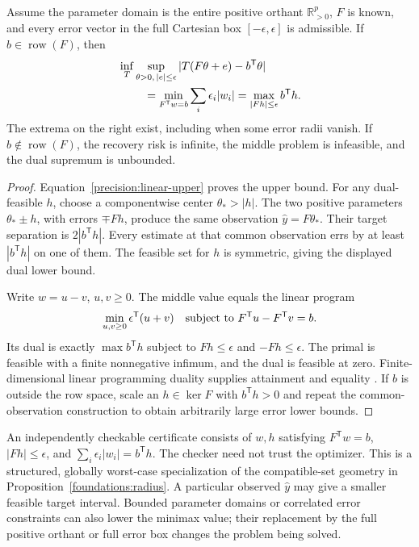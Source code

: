 \begin{theorem}
\label{precision:linear-minimax}
Assume the parameter domain is the entire positive orthant
$\mathbb R^p_{>0}$, $F$ is known, and every error vector in the full Cartesian
box $[-\epsilon,\epsilon]$ is admissible. If $b\in\operatorname{row}(F)$, then
\begin{align}
 &\inf_T\sup_{\theta>0,\,|e|\leq\epsilon}
       |T(F\theta+e)-b^{\mathsf T}\theta| \nonumber\\
 &\hspace{8mm}=\min_{F^{\mathsf T}w=b}\sum_i\epsilon_i|w_i|
   =\max_{|Fh|\leq\epsilon}b^{\mathsf T}h.
 \label{precision:linear-duality}
\end{align}
The extrema on the right exist, including when some error radii vanish.
If $b\notin\operatorname{row}(F)$, the recovery risk is infinite, the middle
problem is infeasible, and the dual supremum is unbounded.
\end{theorem}
\begin{proof}
Equation~\eqref{precision:linear-upper} proves the upper bound. For any dual-feasible
$h$, choose a componentwise center $\theta_*>|h|$. The two positive parameters
$\theta_*\pm h$, with errors $\mp Fh$, produce the same observation
$\widehat y=F\theta_*$. Their target separation is $2|b^{\mathsf T}h|$.
Every estimate at that common observation errs by at least $|b^{\mathsf T}h|$
on one of them. The feasible set for $h$ is symmetric, giving the displayed
dual lower bound.

Write $w=u-v$, $u,v\geq0$. The middle value equals the linear program
\[
 \min_{u,v\geq0}\epsilon^{\mathsf T}(u+v)
 \quad\hbox{subject to }F^{\mathsf T}u-F^{\mathsf T}v=b.
\]
Its dual is exactly $\max b^{\mathsf T}h$ subject to
$Fh\leq\epsilon$ and $-Fh\leq\epsilon$. The primal is feasible with a finite
nonnegative infimum, and the dual is feasible at zero. Finite-dimensional linear
programming duality supplies attainment and equality \cite{caBoyd2004}.
If $b$ is outside the row space, scale an $h\in\ker F$ with
$b^{\mathsf T}h>0$ and repeat the common-observation construction to obtain
arbitrarily large error lower bounds.
\end{proof}

An independently checkable certificate consists of $w,h$ satisfying
$F^{\mathsf T}w=b$, $|Fh|\leq\epsilon$, and
$\sum_i\epsilon_i|w_i|=b^{\mathsf T}h$. The checker need not trust the optimizer.
This is a structured, globally worst-case specialization of the compatible-set
geometry in Proposition~\ref{foundations:radius}. A particular observed
$\widehat y$ may give a smaller feasible target interval. Bounded parameter
domains or correlated error constraints can also lower the minimax value;
their replacement by the full positive orthant or full error box changes the
problem being solved.

